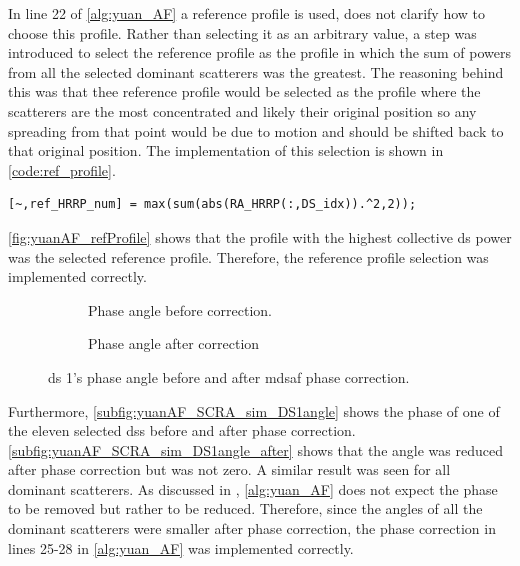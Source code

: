 \documentclass[class=report,11pt,crop=false]{standalone}
\begin{document}
    In line 22 of \autoref{alg:yuan_AF} a reference profile is used, \cite{yuan_AF} does not clarify how to choose this profile. Rather than selecting it as an arbitrary value, a step was introduced to select the reference profile as the profile in which the sum of powers from all the selected dominant scatterers was the greatest. The reasoning behind this was that thee reference profile would be selected as the profile where the scatterers are the most concentrated and likely their original position so any spreading from that point would be due to motion and should be shifted back to that original position. The implementation of this selection is shown in  \autoref{code:ref_profile}.
\begin{lstlisting}[caption={\textsc{MATLAB} code for selecting reference profile.},label={code:ref_profile}]
[~,ref_HRRP_num] = max(sum(abs(RA_HRRP(:,DS_idx)).^2,2));
\end{lstlisting}
    \autoref{fig:yuanAF_refProfile} shows that the profile with the highest collective \gls{ds} power was the selected reference profile. Therefore, the reference profile selection was implemented correctly.

     \begin{figure}[H]
        \centering
        \begin{subfigure}{0.45\linewidth}
            \resizebox{\linewidth}{!}{}
            \caption{Phase angle before correction.} \label{subfig:yuanAF_SCRA_sim_DS1angle_before}
        \end{subfigure}
        \hspace{1cm}
        \begin{subfigure}{0.45\linewidth}
            \resizebox{\linewidth}{!}{}
            \caption{Phase angle after correction} \label{subfig:yuanAF_SCRA_sim_DS1angle_after}
        \end{subfigure}
        \caption{\gls{ds} 1's phase angle before and after \gls{mdsaf} phase correction.\label{subfig:yuanAF_SCRA_sim_DS1angle}}
    \end{figure}
    
    Furthermore, \autoref{subfig:yuanAF_SCRA_sim_DS1angle} shows the phase of one of the eleven selected \gls{ds}s before and after phase correction. \autoref{subfig:yuanAF_SCRA_sim_DS1angle_after} shows that the angle was reduced after phase correction but was not zero. A similar result was seen for all dominant scatterers. As discussed in \cite{yuan_AF}, \autoref{alg:yuan_AF} does not expect the phase to be removed but rather to be reduced. Therefore, since the angles of all the dominant scatterers were smaller after phase correction, the phase correction in lines 25-28 in \autoref{alg:yuan_AF} was implemented correctly. 
\end{document}
